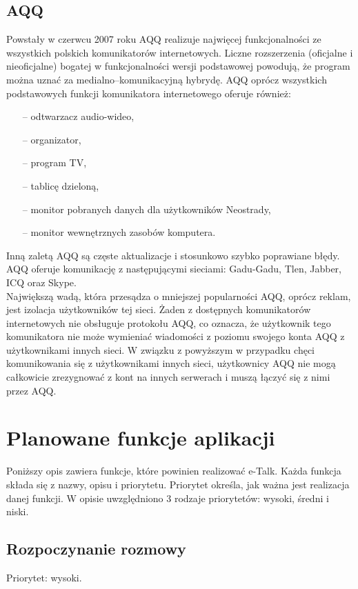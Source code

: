 \documentclass[a4paper,12pt]{article}
\begin{document}
\subsection[AQQ]{AQQ}
Powstały w czerwcu 2007 roku AQQ realizuje najwięcej funkcjonalności ze wszystkich polskich komunikatorów internetowych. Liczne rozszerzenia (oficjalne i nieoficjalne) bogatej w funkcjonalności wersji podstawowej powodują, że program można uznać za medialno--komunikacyjną hybrydę. AQQ oprócz wszystkich podstawowych funkcji komunikatora internetowego oferuje również:
\begin{itemize}
    \item[--] odtwarzacz audio-wideo,
    \item[--] organizator,
    \item[--] program TV,
    \item[--] tablicę dzieloną,
    \item[--] monitor pobranych danych dla użytkowników Neostrady,
    \item[--] monitor wewnętrznych zasobów komputera.
\end{itemize}
Inną zaletą AQQ są częste aktualizacje i stosunkowo szybko poprawiane błędy.\\
AQQ oferuje komunikację z następującymi sieciami: Gadu-Gadu, Tlen, Jabber, ICQ oraz Skype.\\
Największą wadą, która przesądza o mniejszej popularności AQQ, oprócz reklam, jest izolacja użytkowników tej sieci.
Żaden z dostępnych komunikatorów internetowych nie obsługuje protokołu AQQ, co oznacza, że użytkownik tego komunikatora
nie może wymieniać wiadomości z poziomu swojego konta AQQ z użytkownikami innych sieci. W związku z powyższym w przypadku chęci komunikowania się z użytkownikami innych sieci, użytkownicy AQQ nie mogą całkowicie zrezygnować z kont na innych serwerach i muszą łączyć się z nimi przez AQQ.

\section[Planowane funkcje aplikacji e-Talk]{Planowane funkcje aplikacji}
Poniższy opis zawiera funkcje, które powinien realizować e-Talk. Każda funkcja składa się z nazwy, opisu i priorytetu. Priorytet określa, jak ważna jest realizacja danej funkcji. W opisie uwzględniono 3 rodzaje priorytetów: wysoki, średni i niski.
\subsection[Rozpoczynanie rozmowy]{Rozpoczynanie rozmowy}
Priorytet: wysoki.\\
\end{document}
